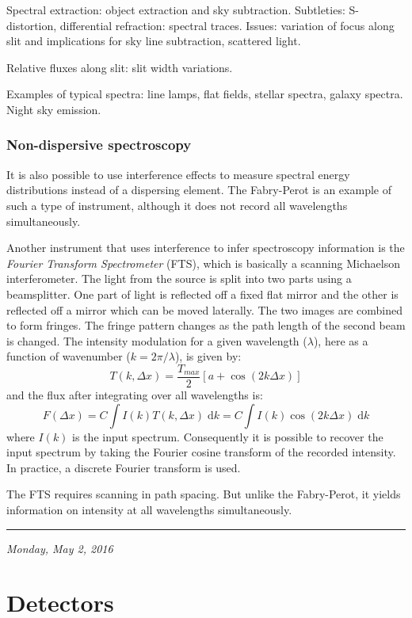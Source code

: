 \documentclass[12pt]{article}
\newcommand{\mydate}[1]{
    \begin{flushright}
        \rule{\textwidth}{0.4pt} %
        \footnotesize\hfill\textit{#1}
    \end{flushright}}
\begin{document}
Spectral extraction: object extraction and sky subtraction.
Subtleties: S-distortion, differential refraction: spectral traces.
Issues: variation of focus along slit and implications for sky line
subtraction, scattered light.

Relative fluxes along slit: slit width variations.

Examples of typical spectra: line lamps, flat fields, stellar spectra,
galaxy spectra. Night sky emission.

\subsubsection{Non-dispersive spectroscopy}
It is also possible to use interference effects to measure spectral
energy distributions instead of a dispersing element. The Fabry-Perot
is an example of such a type of instrument, although it does not
record all wavelengths simultaneously.

Another instrument that uses interference to infer spectroscopy information is
the \textit{Fourier Transform Spectrometer} (FTS), which is basically a
scanning Michaelson interferometer. The light from the source is split into two
parts using a beamsplitter. One part of light is reflected off a fixed flat
mirror and the other is reflected off a mirror which can be moved laterally.
The two images are combined to form fringes. The fringe pattern changes as the
path length of the second beam is changed. The intensity modulation for a given
wavelength ($\lambda$), here as a function of wavenumber ($k = 2\pi/\lambda$),
is given by:
\[
    T \left( k,\Delta{x} \right)
    = \frac{T_{max}}{2} \left[ a + \cos \left( 2k\Delta{x} \right) \right]
    \]
and the flux after integrating over all wavelengths is:
\[
    F \left( \Delta{x}\right)
    = C \int{ I(k) T (k,\Delta{x}) \;\mathrm{d}k}
    = C \int{ I(k) \cos (2k\Delta{x}) \;\mathrm{d}k}
    \]
where $I(k)$ is the input spectrum. Consequently it is possible to recover the
input spectrum by taking the Fourier cosine transform of the recorded
intensity. In practice, a discrete Fourier transform is used.

The FTS requires scanning in path spacing. But unlike the Fabry-Perot,
it yields information on intensity at all wavelengths simultaneously.

\newpage
\mydate{Monday, May 2, 2016}
\section{Detectors}
\end{document}
